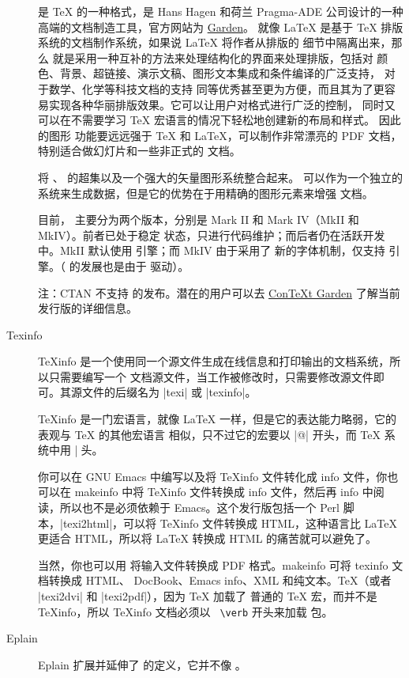 \begin{description}
  \item[\ConTeXt] \ConTeXt{} 是 \TeX{} 的一种格式，是 Hans Hagen 和荷兰 Pragma-ADE 公司设计的一种
    高端的文档制造工具，官方网站为 \href{http://wiki.contextgarden.net}{\ConTeXt{} Garden}。
    \ConTeXt{} 就像 \LaTeX{} 是基于 \TeX{} 排版系统的文档制作系统，如果说 \LaTeX{} 将作者从排版的
    细节中隔离出来，那么 \ConTeXt{} 就是采用一种互补的方法来处理结构化的界面来处理排版，包括对
    颜色、背景、超链接、演示文稿、图形文本集成和条件编译的广泛支持， 对于数学、化学等科技文档的支持
    同等优秀甚至更为方便，而且其为了更容易实现各种华丽排版效果。它可以让用户对格式进行广泛的控制，
    同时又可以在不需要学习 \TeX{} 宏语言的情况下轻松地创建新的布局和样式。 因此 \ConTeXt{} 的图形
    功能要远远强于 \TeX{} 和 \LaTeX{}，可以制作非常漂亮的 PDF 文档，特别适合做幻灯片和一些非正式的
    文档。

    \ConTeXt{} 将 \METAFONT{}、\METAPOST{} 的超集以及一个强大的矢量图形系统整合起来。\MetaFun{}
    可以作为一个独立的系统来生成数据，但是它的优势在于用精确的图形元素来增强 \ConTeXt{} 文档。

    目前，\ConTeXt{} 主要分为两个版本，分别是 Mark II 和 Mark IV（MkII 和 MkIV）。前者已处于稳定
    状态，只进行代码维护；而后者仍在活跃开发中。MkII 默认使用 \pdfTeX{} 引擎；而 MkIV 由于采用了
    新的字体机制，仅支持 \LuaTeX{} 引擎。（\LuaTeX{} 的发展也是由于 \ConTeXt{} 驱动）。

    注：CTAN 不支持 \ConTeXt{} 的发布。潜在的用户可以去
    \href{http://wiki.contextgarden.net/Main_Page}{ConTeXt Garden} 了解当前发行版的详细信息。

  \item[Texinfo] TeXinfo 是一个使用同一个源文件生成在线信息和打印输出的文档系统，所以只需要编写一个
    文档源文件，当工作被修改时，只需要修改源文件即可。其源文件的后缀名为 |texi| 或 |texinfo|。

    TeXinfo 是一门宏语言，就像 \LaTeX{} 一样，但是它的表达能力略弱，它的表观与 \TeX{} 的其他宏语言
    相似，只不过它的宏要以 |@| 开头，而 \TeX{} 系统中用 |\| 开头。

    你可以在 GNU Emacs 中编写以及将 TeXinfo 文件转化成 info 文件，你也可以在 makeinfo 中将 TeXinfo
    文件转换成 info 文件，然后再 info 中阅读，所以也不是必须依赖于 Emacs。这个发行版包括一个 Perl
    脚本，|texi2html|，可以将 TeXinfo 文件转换成 HTML，这种语言比 \LaTeX{} 更适合 HTML，所以将
    \LaTeX{} 转换成 HTML 的痛苦就可以避免了。

    当然，你也可以用 \pdfTeX{} 将输入文件转换成 PDF 格式。makeinfo 可将 texinfo 文档转换成 HTML、
    DocBook、Emacs info、XML 和纯文本。\TeX{}（或者 |texi2dvi| 和 |texi2pdf|），因为 \TeX{} 加载了
    普通的 \TeX{} 宏，而并不是 TeXinfo，所以 TeXinfo 文档必须以 \verb| \verb| 开头来加载
     包。

  \item[Eplain] Eplain 扩展并延伸了 \PlainTeX{} 的定义，它并不像 \ConTeXt{}。
\end{description}


